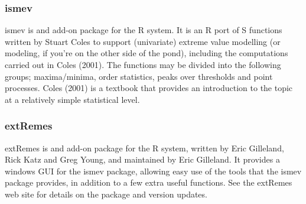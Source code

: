 \documentclass[MAIN.tex]{subfiles}
\begin{document}
\begin{frame}	
\frametitle{ismev}
	
	ismev is and add-on package for the R system. It is an R port of S functions written by Stuart Coles to support (univariate) extreme value modelling (or modeling, if you're on the other side of the pond), including the computations carried out in Coles (2001). The functions may be divided into the following groups; maxima/minima, order statistics, peaks over thresholds and point processes. Coles (2001) is a textbook that provides an introduction to the topic at a relatively simple statistical level.
%	
%	
%	
%	
%	
%
\end{frame}
\begin{frame}
	\frametitle{extRemes}
	
	extRemes is and add-on package for the R system, written by Eric Gilleland, Rick Katz and Greg Young, and maintained by Eric Gilleland. It provides a windows GUI for the ismev package, allowing easy use of the tools that the ismev package provides, in addition to a few extra useful functions. See the extRemes web site for details on the package and version updates.
	

\end{frame}
\end{document}
